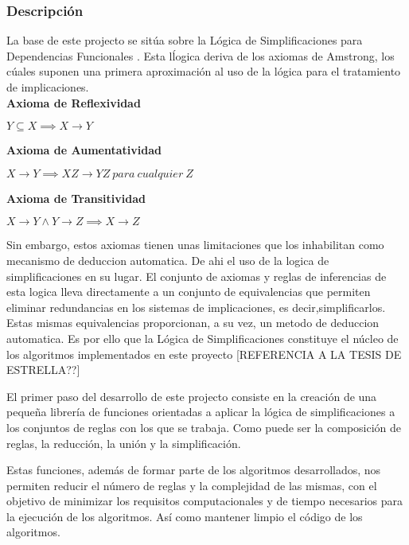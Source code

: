 \subsubsection{Descripci\'on} 

La base de este projecto se sit\'ua sobre la L\'ogica de Simplificaciones para Dependencias Funcionales \cite{Cordero2002}. Esta l\'logica deriva de los axiomas de Amstrong, los c\'uales suponen una primera aproximaci\'on al uso de la l\'ogica para el tratamiento de implicaciones.\\

\textbf{Axioma de Reflexividad}

\begin{center}
    \(Y \subseteq X \implies X \to Y \)
\end{center}

\textbf{Axioma de Aumentatividad}

\begin{center}
    \(X \to Y \implies XZ \to YZ \ para \ cualquier \ Z \)
\end{center}

\textbf{Axioma de Transitividad}

\begin{center}
    \(X \to Y \wedge Y \to Z \implies X \to Z \)
\end{center}

Sin embargo, estos axiomas tienen unas limitaciones que los inhabilitan como mecanismo de deduccion automatica. De ahi el uso de la logica de simplificaciones en su lugar. El conjunto de axiomas y reglas de inferencias de esta logica lleva directamente a un conjunto de equivalencias que permiten eliminar redundancias en los sistemas de implicaciones, es decir,simplificarlos. Estas mismas equivalencias proporcionan, a su vez, un metodo de deduccion automatica. Es por ello que la L\'ogica de Simplificaciones constituye el n\'ucleo de los algoritmos implementados en este proyecto [REFERENCIA A LA TESIS DE ESTRELLA??]




El primer paso del desarrollo de este projecto consiste en la creaci\'on de una peque\~na librer\'ia de funciones
orientadas a aplicar la l\'ogica de simplificaciones a los conjuntos de reglas con los que se trabaja. Como 
puede ser la composici\'on de reglas, la reducci\'on, la uni\'on y la simplificaci\'on.

Estas funciones, adem\'as de formar parte de los algoritmos desarrollados, nos permiten reducir el n\'umero de 
reglas y la complejidad de las mismas, con el objetivo de minimizar los requisitos computacionales y de tiempo
necesarios para la ejecuci\'on de los algoritmos. As\'i como mantener limpio el c\'odigo de los algoritmos.

